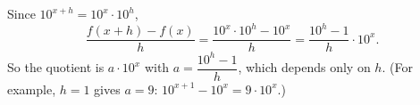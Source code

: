 Since $10^{x+h}=10^x\cdot10^h$,
\[
\dfrac{f(x+h)-f(x)}{h}=\dfrac{10^x\cdot10^h-10^x}{h}=\dfrac{10^h-1}{h}\cdot10^x .
\]
So the quotient is $a\cdot10^x$ with $\boxed{a=\dfrac{10^h-1}{h}}$, which depends only on $h$. (For example, $h=1$ gives $a=9$: $10^{x+1}-10^x=9\cdot10^x$.)
